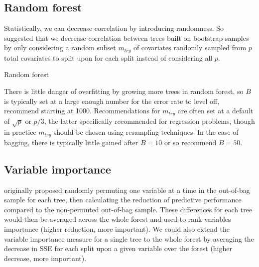 \documentclass[12pt]{article}
\begin{document}

\subsection{Random forest} %
\label{sub:random_forest}

Statistically, we can decrease correlation by introducing randomness. So \textcite{rf} suggested that we decrease correlation between trees built on bootstrap samples by only considering a random subset $m_{try}$ of covariates randomly sampled from $p$ total covariates to split upon for each split instead of considering all $p$.

\begin{algorithm}[ht]
 \caption{Random forest}
\end{algorithm}

There is little danger of overfitting by growing more trees in random forest, so $B$ is typically set at a large enough number for the error rate to level off, \textcite{apm} recommend starting at 1000. Recommendations for $m_{try}$ are often set at a default of $\sqrt{p}$ or $p/3$, the latter specifically recommended for regression problems, though in practice $m_{try}$ should be chosen using resampling techniques. In the case of bagging, there is typically little gained after $B = 10$ or so \textcite{apm} recommend $B = 50$.


\subsection{Variable importance} %
\label{sub:variable_importance_rf}

\textcite{rf} originally proposed randomly permuting one variable at a time in the out-of-bag sample for each tree, then calculating the reduction of predictive performance compared to the non-permuted out-of-bag sample. These differences for each tree would then be averaged across the whole forest and used to rank variables importance (higher reduction, more important). We could also extend the variable importance measure for a single tree to the whole forest by averaging the decrease in SSE for each split upon a given variable over the forest (higher decrease, more important).
\end{document}
